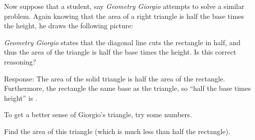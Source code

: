 \documentclass[nooutcomes,space,handout]{ximera}
\begin{document}
\begin{problem}
Now suppose that a student, say \textit{Geometry Giorgio} attempts to
solve a similar problem. Again knowing that the area of a right
triangle is half the base times the height, he draws the following
picture:
\begin{image}
\end{image}
\textit{Geometry Giorgio} states that the diagonal line cuts the
rectangle in half, and thus the area of the triangle is half the base
times the height. Is this correct reasoning? 


Response: The area of the solid triangle is
 half the area of the rectangle.  Furthermore, the rectangle 
 the same base as the triangle, so ``half the base times height'' is 
.  

\begin{problem}
To get a better sense of Giorgio's triangle, try some numbers.  
\begin{image}
\end{image}
Find the area of this triangle (which is much less than half the rectangle).  


\end{problem}
\end{problem}
\end{document}
